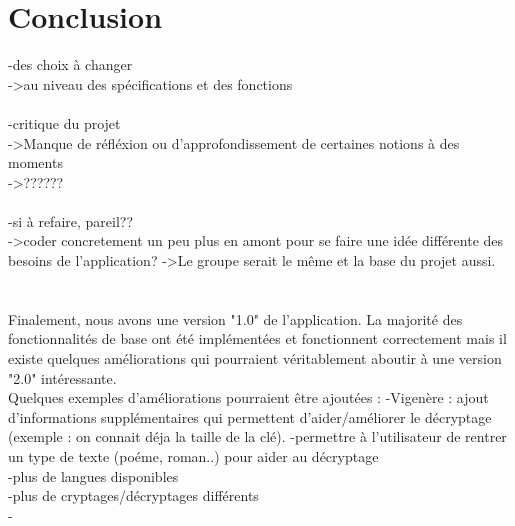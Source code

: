 \documentclass[a4]{article}
\begin{document}
	
	\section{Conclusion}
	-des choix à changer \\
	->au niveau des spécifications et des fonctions \\ \\
	
	-critique du projet \\
	->Manque de réfléxion ou d'approfondissement de certaines notions à des moments \\
	->?????? \\ \\
	
	
		
	-si à refaire, pareil?? \\
	->coder concretement un peu plus en amont pour se faire une idée différente des besoins de l'application?
	->Le groupe serait le même et la base du projet aussi. \\ \\ \\
	
	
	Finalement, nous avons une version "1.0" de l’application. La majorité des fonctionnalités
de base ont été implémentées et fonctionnent correctement mais il existe quelques
améliorations qui pourraient véritablement aboutir à une version "2.0" intéressante. \\
Quelques exemples d'améliorations pourraient être ajoutées :
-Vigenère : ajout d'informations supplémentaires qui permettent d'aider/améliorer le décryptage 
(exemple : on connait déja la taille de la clé).
-permettre à l'utilisateur de rentrer un type de texte (poéme, roman..) pour aider au décryptage \\
-plus de langues disponibles \\
-plus de cryptages/décryptages différents \\

-\\ \\ \\

	
	
\end{document}
